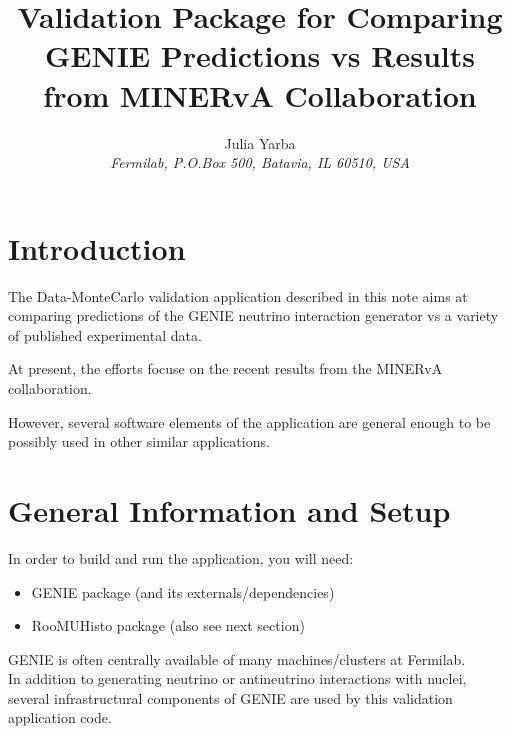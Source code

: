 


\oddsidemargin=10mm
\evensidemargin=-10mm
\topmargin=0mm
\headheight=0mm
\headsep=0mm
\textheight=230mm
\textwidth=175mm
\voffset=-0.5cm
\hoffset=-1.5cm



\title{ 
Validation Package for Comparing GENIE Predictions vs Results from MINERvA Collaboration
}
\author{
Julia Yarba                             \\
{\em Fermilab, P.O.Box 500, Batavia, IL 60510, USA} \\
}
\maketitle

\baselineskip=17pt

\section{Introduction}

The Data-MonteCarlo validation application described in this note aims at comparing predictions of the GENIE\cite{geniemanual} 
neutrino interaction generator vs a variety of published experimental data.

At present, the efforts focuse on the recent results from the MINERvA collaboration\cite{minerva1}.

However, several software elements of the application are general enough to be possibly used in other 
similar applications.

\section{General Information and Setup}

In order to build and run the application, you will need:
\begin{itemize}
\item{GENIE package (and its externals/dependencies)}
\item{RooMUHisto package\cite{roomuhistos} (also see next section)}
\end{itemize}

GENIE is often centrally available of many machines/clusters at Fermilab. \\
In addition to generating neutrino or antineutrino interactions with nuclei, several infrastructural components 
of GENIE are used by this validation application code.

